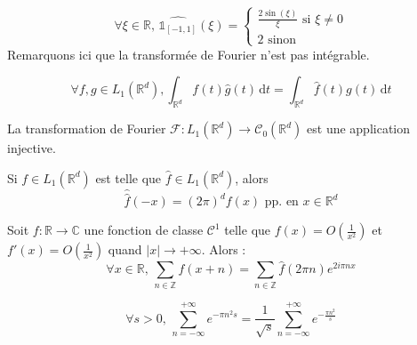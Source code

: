   \begin{example}
    \[
    \forall \xi \in \mathbb{R}, \, \widehat{\mathbb{1}_{[-1,1]}}(\xi) =
    \begin{cases}
      \frac{2 \sin(\xi)}{\xi} \text{ si } \xi \neq 0 \\
      2 \text{ sinon}
    \end{cases}
    \]
    Remarquons ici que la transformée de Fourier n'est pas intégrable.
  \end{example}

  \begin{theorem}
    \[ \forall f, g \in L_1(\mathbb{R}^d), \int_{\mathbb{R}^d} f(t) \widehat{g}(t) \, \mathrm{d}t = \int_{\mathbb{R}^d} \widehat{f}(t) g(t) \, \mathrm{d}t \]
  \end{theorem}

  \begin{corollary}
    La transformation de Fourier $\mathcal{F} : L_1(\mathbb{R}^d) \rightarrow \mathcal{C}_0(\mathbb{R}^d)$ est une application injective.
  \end{corollary}

  \begin{theorem}
    Si $f \in L_1(\mathbb{R}^d)$ est telle que $\widehat{f} \in L_1(\mathbb{R}^d)$, alors
    \[ \widehat{\widehat{f}}(-x) = (2\pi)^d f(x) \text{ pp. en } x \in \mathbb{R}^d \]
  \end{theorem}


  \begin{theorem}
    Soit $f : \mathbb{R} \rightarrow \mathbb{C}$ une fonction de classe $\mathcal{C}^1$ telle que $f(x) = O \left( \frac{1}{x^2} \right)$ et $f'(x) = O \left( \frac{1}{x^2} \right)$ quand $|x| \longrightarrow +\infty$. Alors :
    \[ \forall x \in \mathbb{R}, \, \sum_{n \in \mathbb{Z}} f(x+n) = \sum_{n \in \mathbb{Z}} \widehat{f}(2 \pi n) e^{2 i \pi n x} \]
  \end{theorem}

  \begin{application}
    \[ \forall s > 0, \, \sum_{n=-\infty}^{+\infty} e^{-\pi n^2 s} = \frac{1}{\sqrt{s}} \sum_{n=-\infty}^{+\infty} e^{-\frac{\pi n^2}{s}} \]
  \end{application}

